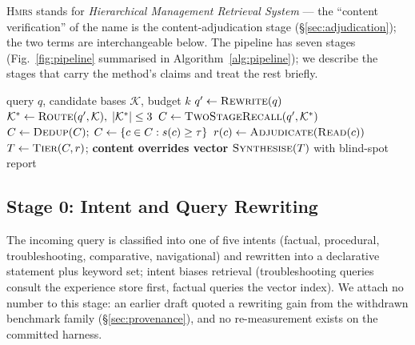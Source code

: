 \documentclass[sigconf, review, anonymous]{acmart}
\newcommand{\sys}{\textsc{Hmrs}}
\begin{document}
\sys{} stands for \emph{Hierarchical Management Retrieval System} --- the
``content verification'' of the name is the content-adjudication stage
(\S\ref{sec:adjudication}); the two terms are interchangeable below. The pipeline
has seven stages (Fig.~\ref{fig:pipeline} summarised in
Algorithm~\ref{alg:pipeline}); we describe the stages that carry the method's
claims and treat the rest briefly.



\begin{algorithm}[t]
\footnotesize
\caption{\sys{} retrieval}\label{alg:pipeline}
\begin{algorithmic}[1]
\Require query $q$, candidate bases $\mathcal{K}$, budget $k$
\State $q' \leftarrow \textsc{Rewrite}(q)$ 
\State $\mathcal{K}^{*} \leftarrow \textsc{Route}(q', \mathcal{K}),\; |\mathcal{K}^{*}| \le 3$
\State $C \leftarrow \textsc{TwoStageRecall}(q', \mathcal{K}^{*})$ 
\State $C \leftarrow \textsc{Dedup}(C);\; C \leftarrow \{c \in C : s(c) \ge \tau\}$
  \State $r(c) \leftarrow \textsc{Adjudicate}(\textsc{Read}(c))$
\EndFor
\State $T \leftarrow \textsc{Tier}(C, r)$; \textbf{content overrides vector}
\State \Return $\textsc{Synthesise}(T)$ with blind-spot report
\end{algorithmic}
\end{algorithm}

\subsection{Stage 0: Intent and Query Rewriting}\label{sec:intent}
The incoming query is classified into one of five intents (factual, procedural,
troubleshooting, comparative, navigational) and rewritten into a declarative
statement plus keyword set; intent biases retrieval (troubleshooting queries
consult the experience store first, factual queries the vector index). We
attach no number to this stage: an earlier draft quoted a rewriting gain from
the withdrawn benchmark family (\S\ref{sec:provenance}), and no re-measurement
exists on the committed harness.
\end{document}
